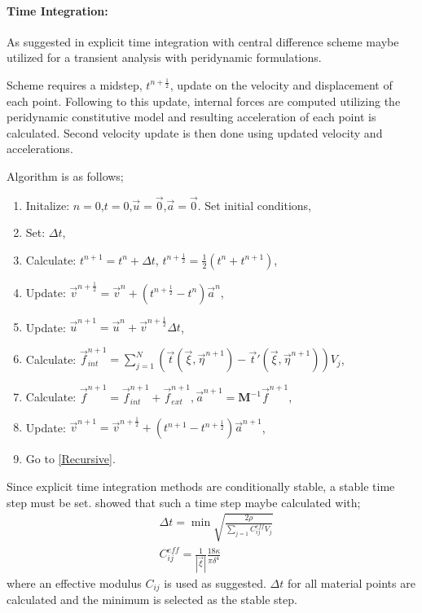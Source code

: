 \documentclass[10pt,a4paper,onecolumn]{article}
\begin{document}
\paragraph{Time Integration:}
As suggested in \cite{ROADMAP} explicit time integration with central difference scheme maybe utilized for a transient analysis with peridynamic formulations. 

Scheme requires a midstep, $t^{n+\frac{1}{2}}$, update on the velocity and displacement of each point. Following to this update, internal forces are computed utilizing the peridynamic constitutive model and resulting acceleration of each point is calculated. Second velocity update is then done using updated velocity and accelerations. 

Algorithm is as follows; 
\begin{enumerate}
\item Initalize: $n=0$,$t=0$,$\vec{u}=\vec{0}$,$\vec{a}=\vec{0}$. Set initial conditions,
\item Set: $\Delta t$,
\item Calculate: $t^{n+1} = t^n+\Delta t$, $t^{n+\frac{1}{2}}=\frac{1}{2}(t^n+t^{n+1})$,
\label{Recursive}
\item Update: $\vec{v}^{n+\frac{1}{2}}=\vec{v}^n+(t^{n+\frac{1}{2}}-t^n)\vec{a}^n$,
\item Update: $\vec{u}^{n+1}=\vec{u}^n+\vec{v}^{n+\frac{1}{2}}\Delta t$,
\item Calculate: $\vec{f}_{int}^{n+1}=\sum_{j=1}^N\left(\vec{t}(\vec{\xi},\vec{\eta}^{n+1})-\vec{t}'(\vec{\xi},\vec{\eta}^{n+1})\right)V_j$,
\item Calculate: $\vec{f}^{n+1} =\vec{f}_{int}^{n+1} +\vec{f}_{ext}^{n+1},  \vec{a}^{n+1} = \mathbf{M}^{-1}\vec{f}^{n+1}$,
\item Update: $\vec{v}^{n+1} = \vec{v}^{n+\frac{1}{2}}+(t^{n+1}-t^{n+\frac{1}{2}})\vec{a}^{n+1}$,
\item Go to \ref{Recursive}.
\end{enumerate}
Since explicit time integration methods are conditionally stable, a stable time step must be set. \cite{SILLING20051526} showed that such a time step maybe calculated with; 
\begin{align}
&\Delta t=\min{\sqrt{\frac{2\rho}{\sum_{j=1}C_{ij}^{eff}V_j}}}\\
&C_{ij}^{eff}=\frac{1}{|\vec{\xi}|}\frac{18\kappa}{\pi \delta^4}
\end{align}
where an effective modulus $C_{ij}$ is used as suggested. $\Delta t$ for all material points are calculated and the minimum is selected as the stable step. 
\pagebreak
\end{document}
